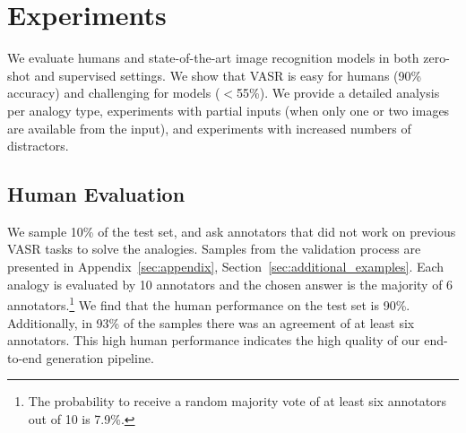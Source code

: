 \documentclass[letterpaper]{article} \usepackage{aaai23}  \usepackage{times}  \usepackage{helvet}  \usepackage{courier}  \usepackage[hyphens]{url}  \usepackage{graphicx} \urlstyle{rm} \def\UrlFont{\rm}  \usepackage{natbib}  \usepackage{caption} \frenchspacing  \setlength{\pdfpagewidth}{8.5in}  \setlength{\pdfpageheight}{11in}  \usepackage{algorithm}
\begin{document}
\section{Experiments}
\label{sec:experiments}
We evaluate humans and state-of-the-art image recognition models in both zero-shot and supervised settings. We show that VASR is easy for humans (90\% accuracy) and challenging for models ($<$55\%). We provide a detailed analysis per analogy type, experiments with partial inputs (when only one or two images are available from the input), and experiments with increased numbers of distractors.



\subsection{Human Evaluation}
We sample 10\% of the test set, and ask annotators that did not work on previous VASR tasks to solve the analogies. Samples from the validation process are presented in Appendix~\ref{sec:appendix}, Section~\ref{sec:additional_examples}. Each analogy is evaluated by 10 annotators and the chosen answer is the majority of 6 annotators.\footnote{The probability to receive a random majority vote of at least six annotators out of 10 is 7.9\%.} We find that the human performance on the test set is 90\%. Additionally, in 93\% of the samples there was an agreement of at least six annotators. This high human performance indicates the high
quality of our end-to-end generation pipeline. 
\end{document}
